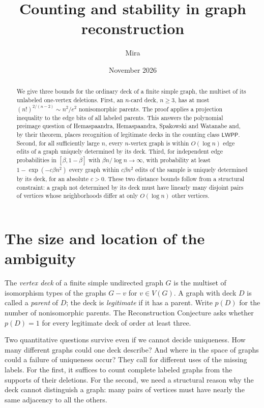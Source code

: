 \documentclass[11pt]{article}
\title{Counting and stability in graph reconstruction}
\author{Mira}
\date{November 2026}
\theoremstyle{definition}\newtheorem{definition}[theorem]{Definition}\theoremstyle{plain}
\newcommand{\LWPP}{\mathsf{LWPP}}
\begin{document}
\maketitle
\begin{abstract}
We give three bounds for the ordinary deck of a finite simple graph, the multiset of its unlabeled one-vertex deletions. First, an $n$-card deck, $n\ge3$, has at most $(n!)^{2/(n-2)}\sim n^2/e^2$ nonisomorphic parents. The proof applies a projection inequality to the edge bits of all labeled parents. This answers the polynomial preimage question of Hemaspaandra, Hemaspaandra, Spakowski and Watanabe and, by their theorem, places recognition of legitimate decks in the counting class $\LWPP$. Second, for all sufficiently large $n$, every $n$-vertex graph is within $O(\log n)$ edge edits of a graph uniquely determined by its deck. Third, for independent edge probabilities in $[\beta,1-\beta]$ with $\beta n/\log n\to\infty$, with probability at least $1-\exp(-c\beta n^2)$ every graph within $c\beta n^2$ edits of the sample is uniquely determined by its deck, for an absolute $c>0$. These two distance bounds follow from a structural constraint: a graph not determined by its deck must have linearly many disjoint pairs of vertices whose neighborhoods differ at only $O(\log n)$ other vertices.
\end{abstract}

\section{The size and location of the ambiguity}
The \emph{vertex deck} of a finite simple undirected graph $G$ is the multiset of isomorphism types of the graphs $G-v$ for $v\in V(G)$. A graph with deck $D$ is called a \emph{parent} of $D$; the deck is \emph{legitimate} if it has a parent. Write $p(D)$ for the number of nonisomorphic parents. The Reconstruction Conjecture asks whether $p(D)=1$ for every legitimate deck of order at least three.

Two quantitative questions survive even if we cannot decide uniqueness. How many different graphs could one deck describe? And where in the space of graphs could a failure of uniqueness occur? They call for different uses of the missing labels. For the first, it suffices to count complete labeled graphs from the supports of their deletions. For the second, we need a structural reason why the deck cannot distinguish a graph: many pairs of vertices must have nearly the same adjacency to all the others.
\end{document}
